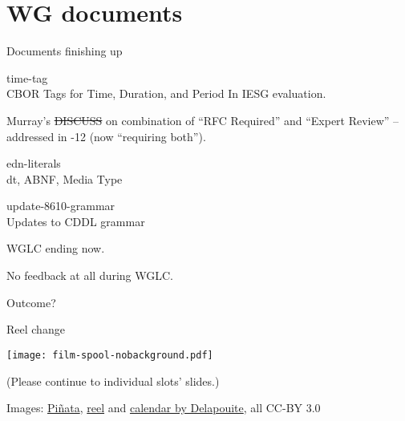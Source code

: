 \documentclass[aspectratio=169]{beamer}
\begin{document}
\section*{WG documents}

\begin{frame}{Documents finishing up}\large

    \begin{block}{\Large time-tag \\ \small CBOR Tags for Time, Duration, and Period}
        In IESG evaluation.

        \medskip

        Murray's \sout{DISCUSS} on combination of ``RFC Required'' and ``Expert Review''
        -- addressed in -12 (now ``requiring both'').
    \end{block}

    \bigskip

    \begin{block}{edn-literals \\ \scriptsize dt\textquotedbl\textquotedbl, ABNF, Media Type

        \normalsize \mbox{update-8610-grammar} \\ \scriptsize Updates to CDDL grammar
        }
        WGLC ending now.

        \medskip

        No feedback at all during WGLC.

        \medskip

        Outcome?
    \end{block}

\end{frame}

\begin{frame}{Reel change}
    \begin{block}{\texttt{[image: film-spool-nobackground.pdf]}\mbox{\quad}}
        \mbox{}

        \vspace{-1.7cm}

        (Please continue to individual slots' slides.)
    \end{block}

    \vfill
    \tiny Images:
    \href{https://game-icons.net/1x1/delapouite/pinata.html}{Piñata},
    \href{https://game-icons.net/1x1/delapouite/film-spool.html}{reel} and
    \href{https://game-icons.net/1x1/delapouite/calendar.html}{calendar by Delapouite}, all CC-BY 3.0
\end{frame}
\end{document}
